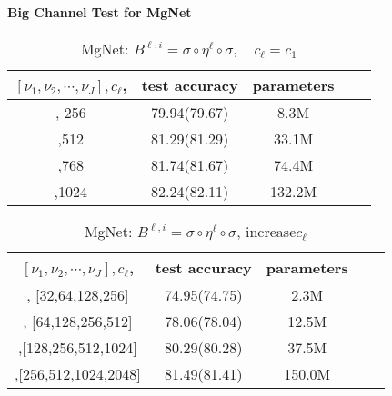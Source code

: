 \paragraph{Big Channel Test for MgNet}

\begin{table}[!htbp]
	\caption{MgNet: $B^{\ell,i}=\sigma \circ \eta^{\ell} \circ \sigma,\quad c_\ell=c_1$}
	\begin{center}
		\begin{tabular}{|c|c|c|c|c|}
			\hline
			$[\nu_1,\nu_2,\cdots,\nu_J], c_\ell$,   &  test accuracy
			& parameters   \tabularnewline
			\hline
			[2,2,2,2], 256    &  79.94(79.67)  & 8.3M
			\tabularnewline
			\hline			
			[2,2,2,2],512     & 81.29(81.29)     & 33.1M
			\tabularnewline
			\hline
			[2,2,2,2],768   & 81.74(81.67)     & 74.4M 
			\tabularnewline
			\hline
			[2,2,2,2],1024    & 82.24(82.11)    & 132.2M 
			\tabularnewline
			\hline						
		\end{tabular} 
	\end{center}
\end{table}

\begin{table}[!htbp]
	\caption{MgNet: $B^{\ell,i}=\sigma \circ \eta^{\ell} \circ \sigma$, increase$c_\ell$}
	\begin{center}
		\begin{tabular}{|c|c|c|c|c|}
			\hline
			$[\nu_1,\nu_2,\cdots,\nu_J], c_\ell$,  &  test accuracy
			& parameters  \tabularnewline
			\hline
			[2,2,2,2], [32,64,128,256]   &  74.95(74.75)  & 2.3M
			\tabularnewline
			\hline			
			[2,2,2,2], [64,128,256,512]      & 78.06(78.04)     & 12.5M
			\tabularnewline
			\hline
			[2,2,2,2],[128,256,512,1024]     & 80.29(80.28)      & 37.5M 
			\tabularnewline
			\hline
			[2,2,2,2],[256,512,1024,2048]     & 81.49(81.41)    & 150.0M 
			\tabularnewline
			\hline						
		\end{tabular} 
	\end{center}
\end{table}

\newpage
